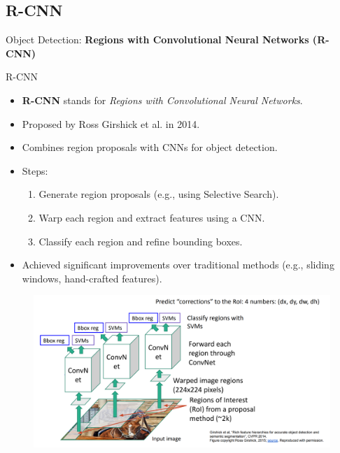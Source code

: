 \subsection{R-CNN}
\begin{frame}{}
    \LARGE Object Detection: \textbf{Regions with Convolutional Neural Networks (R-CNN)}
\end{frame}

\begin{frame}[allowframebreaks]{R-CNN}
    \begin{itemize}
        \item \textbf{R-CNN} stands for \textit{Regions with Convolutional Neural Networks}.
        \item Proposed by Ross Girshick et al. in 2014.
        \item Combines region proposals with CNNs for object detection.
        \item Steps:
        \begin{enumerate}
            \item Generate region proposals (e.g., using Selective Search).
            \item Warp each region and extract features using a CNN.
            \item Classify each region and refine bounding boxes.
        \end{enumerate}
        \item Achieved significant improvements over traditional methods (e.g., sliding windows, hand-crafted features).
    \end{itemize}

\framebreak

    \begin{figure}
        \centering
        \includegraphics[width=1.0\textwidth,height=1.0\textheight,keepaspectratio]{images/object-detect/rcnn_1.png}
    \end{figure}


\end{frame}
